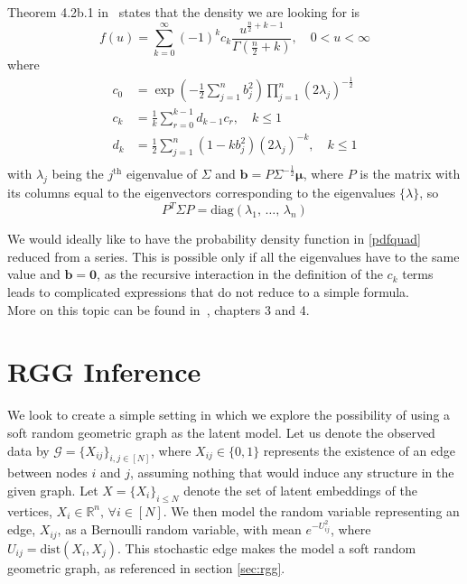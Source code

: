 \documentclass[12pt]{report}
\newcommand{\bs}{\boldsymbol}
\newcommand{\mc}[1]{\mathcal{#1}}
\newcommand{\mb}[1]{\mathbb{#1}}
\newcommand{\half}{\frac{1}{2}}
\newcommand{\sumlim}[3]{\sum\limits_{#1 = #2}^{#3}}
\newcommand{\prodlim}[3]{\prod\limits_{#1 = #2}^{#3}}
\renewcommand{\bs}{\boldsymbol}
\begin{document}
Theorem 4.2b.1 in~\parencite{mathai} states that the density we are looking for is
\begin{equation}
    \label{pdfquad}
    f(u) = \sumlim{k}{0}{\infty}(-1)^kc_k\frac{u^{\frac{n}{2} + k - 1}}{\Gamma(\frac{n}{2} + k)},\quad 0 < u < \infty
\end{equation}
where
\begin{align}
    c_0 &= \exp\left(-\half\sumlim{j}{1}{n}b_j^2\right)\prodlim{j}{1}{n}(2\lambda_j)^{-\half} \\
    c_k &= \frac{1}{k}\sumlim{r}{0}{k - 1}d_{k-1}c_r,\quad k \leq 1 \label{ck}\\
    d_k &= \half\sumlim{j}{1}{n}(1 - kb_j^2)(2\lambda_j)^{-k},\quad k \leq 1 \label{dk}\\
\end{align}
with $\lambda_j$ being the $j^\text{th}$ eigenvalue of $\Sigma$ and $\bs{b} = P\Sigma^{-\half}\bs{\mu}$, where $P$ is the matrix with its columns equal to the eigenvectors corresponding to the eigenvalues $\{\lambda\}$, so
\begin{equation}
    P^T\Sigma P = \text{diag}(\lambda_1,\,\dots,\,\lambda_n)
\end{equation}

We would ideally like to have the probability density function in \ref{pdfquad} reduced from a series. This is possible only if all the eigenvalues have to the same value and $\bs{b} = \bs{0}$, as the recursive interaction in the definition of the $c_k$ terms leads to complicated expressions that do not reduce to a simple formula. \\

More on this topic can be found in~\parencite{mathai}, chapters 3 and 4.

\chapter{RGG Inference}\label{ch:rgginf}
We look to create a simple setting in which we explore the possibility of using a soft random geometric graph as the latent model. Let us denote the observed data by $\mc{G} = \{X_{ij}\}_{i, j \in [N]}$, where $X_{ij} \in \{0,1\}$ represents the existence of an edge between nodes $i$ and $j$, assuming nothing that would induce any structure in the given graph. Let $X = \{X_i\}_{i \leq N}$ denote the set of latent embeddings of the vertices, $X_i \in \mb{R}^n,\,\forall i \in [N]$. We then model the random variable representing an edge, $X_{ij}$, as a Bernoulli random variable, with mean $e^{-U_{ij}^2}$, where $U_{ij} = \text{dist}(X_i, X_j)$. This stochastic edge makes the model a soft random geometric graph, as referenced in section \ref{sec:rgg}. \\
\end{document}
